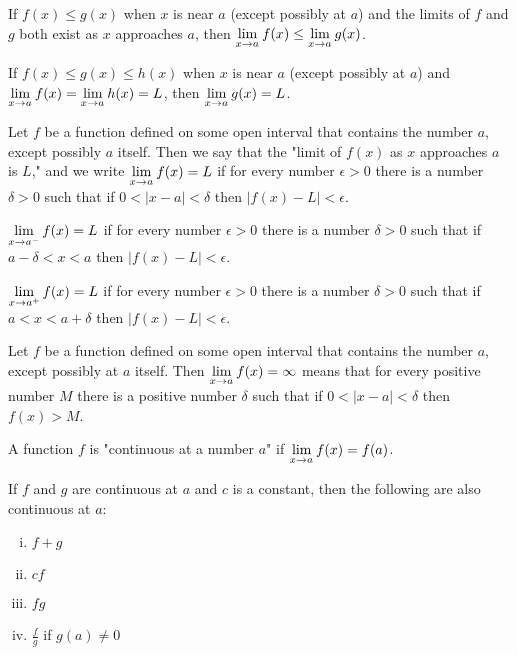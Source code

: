 \documentclass[a4paper,8pt]{article}
\begin{document}
\begin{outline}
    If \(f(x) \leq g(x)\) when \(x\) is near \(a\) (except possibly at \(a\)) and the limits of
    \(f\) and \(g\) both exist as \(x\) approaches \(a\), then \(\xlimit{x}{a} f(x) \leq \xlimit{x}{a} g(x)\).

    If \(f(x) \leq g(x) \leq h(x)\) when \(x\) is near \(a\) (except possibly at \(a\)) and \(\xlimit{x}{a}f(x) =
    \xlimit{x}{a}h(x) = L\), then \(\xlimit{x}{a} g(x) = L\).

    Let \(f\) be a function defined on some open interval that contains the number \(a\), except possibly \(a\)
    itself. Then we say that the "limit of \(f(x)\) as \(x\) approaches \(a\) is \(L\)," and we write
    \(\xlimit{x}{a} f(x) = L\) if for every number \(\epsilon > 0\) there is a number \(\delta > 0\) such that
    if \(0 < |x - a| < \delta\) then \(|f(x)-L| < \epsilon\).

    \(\xlimit[-]{x}{a} f(x) = L\) if for every number \(\epsilon > 0\) there is a number \(\delta > 0\)
    such that if \(a - \delta < x < a\) then \(|f(x)-L| < \epsilon\).

    \(\xlimit[+]{x}{a} f(x) = L\) if for every number \(\epsilon > 0\) there is a number \(\delta > 0\) such
    that if \(a < x < a + \delta\) then \(|f(x)-L| < \epsilon\).

    Let \(f\) be a function defined on some open interval that contains the number \(a\), except possibly at
    \(a\) itself. Then \(\xlimit{x}{a} f(x) = \infty\) means that for every positive number \(M\) there is a
    positive number \(\delta\) such that if \(0 < |x-a| < \delta\) then \(f(x) > M\).

    A function \(f\) is "continuous at a number \(a\)" if \(\xlimit{x}{a} f(x) = f(a)\).

    If \(f\) and \(g\) are continuous at \(a\) and \(c\) is a constant, then the following are also
    continuous at \(a\):
    \begin{enumerate}[i.]
      \item \(f + g\)
      \item \(cf\)
      \item \(fg\)
      \item \(\frac{f}{g}\) if \(g(a) \neq 0\)
    \end{enumerate}


\end{outline}
\end{document}
